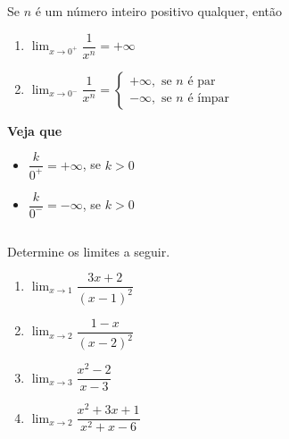 \begin{frame}
  \begin{columns}[onlytextwidth]
    \begin{column}{0.5\textwidth}\vspace*{-0.5cm}
      \begin{theorem}[\phantom{ç}]
        Se $n$ é um número inteiro positivo qualquer, então
      \begin{enumerate}
        \item $\displaystyle\lim_{x\rightarrow 0^{+}}\dfrac{1}{x^{n}} = +\infty$
        \item $\displaystyle\lim_{x\rightarrow 0^{-}}\dfrac{1}{x^{n}} = \begin{cases}
          +\infty, \mbox{ se $n$ é par} \\
          -\infty, \mbox{ se $n$ é ímpar}
        \end{cases}$
      \end{enumerate}
      \end{theorem}
      \begin{highlight}
        \textbf{Veja que}
        \begin{itemize}
          \item $\dfrac{k}{0^{+}} = +\infty$, se $k > 0$
          \item $\dfrac{k}{0^{-}} = -\infty$, se $k > 0$
        \end{itemize}
      \end{highlight}
    \end{column}
    \begin{column}{0.5\textwidth}
      \begin{figure}
      \end{figure}
    \end{column}
  \end{columns}
\end{frame}

\begin{frame}
  \begin{example}
    Determine os limites a seguir.
  \end{example}
  \begin{enumerate}
    \item $\displaystyle\lim_{x\rightarrow 1}\dfrac{3x+2}{(x-1)^{2}}$
    \item $\displaystyle\lim_{x\rightarrow 2}\dfrac{1-x}{(x-2)^{2}}$
    \item $\displaystyle\lim_{x\rightarrow 3}\dfrac{x^{2}-2}{x-3}$
    \item $\displaystyle\lim_{x\rightarrow 2}\dfrac{x^{2} + 3x + 1}{x^{2} + x - 6}$
  \end{enumerate}
\end{frame}

